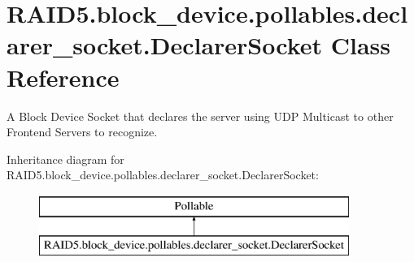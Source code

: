 \hypertarget{class_r_a_i_d5_1_1block__device_1_1pollables_1_1declarer__socket_1_1_declarer_socket}{}\section{R\+A\+I\+D5.\+block\+\_\+device.\+pollables.\+declarer\+\_\+socket.\+Declarer\+Socket Class Reference}
\label{class_r_a_i_d5_1_1block__device_1_1pollables_1_1declarer__socket_1_1_declarer_socket}


A Block Device Socket that declares the server using U\+DP Multicast to other Frontend Servers to recognize.  


Inheritance diagram for R\+A\+I\+D5.\+block\+\_\+device.\+pollables.\+declarer\+\_\+socket.\+Declarer\+Socket\+:\begin{figure}[H]
\begin{center}
\leavevmode
\includegraphics[height=2.000000cm]{class_r_a_i_d5_1_1block__device_1_1pollables_1_1declarer__socket_1_1_declarer_socket}
\end{center}
\end{figure}
